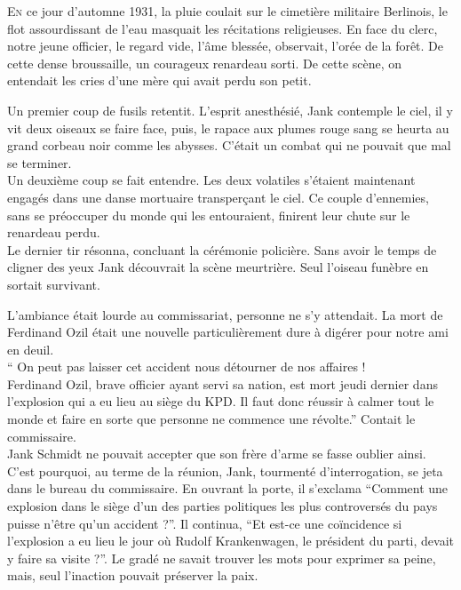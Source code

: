 \lettrine{E}{n} ce jour d'automne 1931, la pluie coulait sur le cimetière militaire Berlinois,
le flot assourdissant de l'eau masquait les récitations religieuses.
En face du clerc, notre jeune officier, le regard vide, l'âme blessée, observait, l'orée de la forêt. 
De cette dense broussaille, un courageux renardeau sorti.
De cette scène, on entendait les cries d'une mère qui avait perdu son petit.

Un premier coup de fusils retentit.
L'esprit anesthésié, Jank contemple le ciel, il y vit deux oiseaux se faire face, puis, le rapace aux plumes rouge sang se heurta au grand corbeau noir comme les abysses.
C'était un combat qui ne pouvait que mal se terminer.\\
Un deuxième coup se fait entendre.
Les deux volatiles s'étaient maintenant engagés dans une danse mortuaire transperçant le ciel.
Ce couple d'ennemies, sans se préoccuper du monde qui les entouraient, finirent leur chute sur le renardeau perdu.\\
Le dernier tir résonna, concluant la cérémonie policière.
Sans avoir le temps de cligner des yeux Jank découvrait la scène meurtrière.
Seul l'oiseau funèbre en sortait survivant.

L'ambiance était lourde au commissariat, personne ne s'y attendait.
La mort de Ferdinand Ozil était une nouvelle particulièrement dure à digérer pour notre ami en deuil.\\
\enquote{%
    On peut pas laisser cet accident nous détourner de nos affaires !\\
    Ferdinand Ozil, brave officier ayant servi sa nation, est mort jeudi dernier dans l'explosion qui a eu lieu au siège du KPD.
    Il faut donc réussir à calmer tout le monde et faire en sorte que personne ne commence une révolte.}
Contait le commissaire.\\
Jank Schmidt ne pouvait accepter que son frère d'arme se fasse oublier ainsi.
C'est pourquoi, au terme de la réunion, Jank, tourmenté d'interrogation, se jeta dans le bureau du commissaire.
En ouvrant la porte, il s'exclama
\enquote{Comment une explosion dans le siège d'un des parties politiques les plus controversés du pays puisse n'être qu'un accident ?}.
Il continua,
\enquote{Et est-ce une coïncidence si l'explosion a eu lieu le jour où Rudolf Krankenwagen, le président du parti, devait y faire sa visite ?}.
Le gradé ne savait trouver les mots pour exprimer sa peine, mais, seul l'inaction pouvait préserver la paix.

